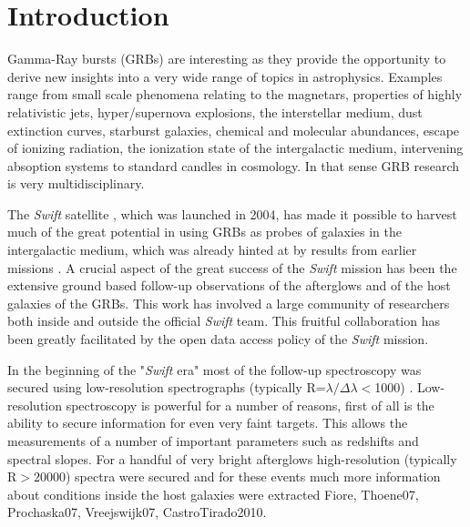 \documentclass{aa}    %
\begin{document}

\maketitle

\section{Introduction}

Gamma-Ray bursts (GRBs) are interesting as they provide the opportunity to
derive new insights into a very wide range of topics in astrophysics. Examples
range from small scale phenomena relating to the magnetars, properties of highly
relativistic jets, hyper/supernova explosions, the interstellar medium, dust extinction
curves, starburst galaxies, chemical and molecular abundances, escape of ionizing 
radiation, the ionization state of the intergalactic medium, intervening
absoption systems to standard candles in cosmology.  In that sense GRB research
is very multidisciplinary. 

The {\it Swift} satellite \citep{Gehrels09}, which was launched in 2004, has
made it possible to harvest much of the great potential in using GRBs as probes
of galaxies in the intergalactic medium, which was already hinted at by results
from earlier missions \citep[e.g.][]{Ricker04}.  A crucial aspect of the great
success of the {\it Swift} mission has been the extensive ground based
follow-up observations of the afterglows and of the host galaxies of the GRBs.
This work has involved a large community of researchers both inside and outside
the official {\it Swift} team. This fruitful collaboration has been greatly
facilitated by the open data access policy of the {\it Swift} mission.

In the beginning of the "{\it Swift} era" most of the follow-up spectroscopy
was secured using low-resolution spectrographs (typically
R=$\lambda/\Delta\lambda$$<$1000) \citep[e.g.][]{Fynbo2009}. Low-resolution
spectroscopy is powerful for a number of reasons, first of all is the ability
to secure information for even very faint targets. This allows the measurements
of a number of important parameters such as redshifts and spectral slopes. For
a handful of very bright afterglows high-resolution (typically R$>$20000)
spectra were secured and for these events much more information about
conditions inside the host galaxies were extracted \citep[e.g.,]{}{Fiore,
Thoene07, Prochaska07, Vreejswijk07, CastroTirado2010}. 
\end{document}
